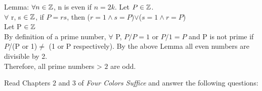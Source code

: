 \documentclass{article}
\begin{document}
  Lemma:  $\forall n \in {\mathbb Z}$, n is even if $n=2k$.
  Let $P \in {\mathbb Z}$. \\
  $\forall$ r, s $\in {\mathbb Z}$,
  if $P = rs$, then ($r=1 \land s=P$)$\lor$($s=1 \land r=P$) \\
  Let P $\in {\mathbb Z}$ \\
  By definition of a prime number,
  $\forall$ P, $P/P=1$ or $P/1=P$ and P is not prime if $P$/(P or 1)$ \neq$
  (1 or P respectively). By the above Lemma all even numbers are divisible
  by 2.\\
  Therefore, all prime numbers > $2$ are odd.


%
Read Chapters $2$ and $3$ of \emph{Four Colors Suffice} and answer the following
 questions:
\end{document}
